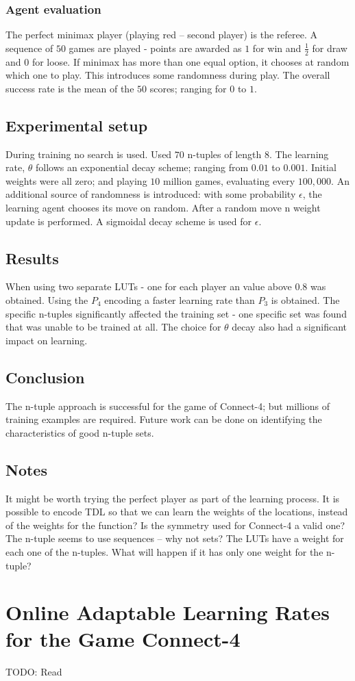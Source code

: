 \subsubsection{Agent evaluation}
The perfect minimax player (playing red -- second player) is the referee. A sequence of $50$ games are played - points are awarded as $1$ for win and $\frac{1}{2}$ for draw and $0$ for loose. If minimax has more than one equal option, it chooses at random which one to play.  This introduces some randomness during play.  The overall success rate is the mean of the $50$ scores; ranging for $0$ to $1$. 
\subsection{Experimental setup}
During training no search is used.  Used $70$ n-tuples of length $8$.  The learning rate, $\theta$ follows an exponential decay scheme; ranging from $0.01$ to $0.001$.  Initial weights were all zero; and playing $10$ million games, evaluating every $100,000$.
An additional source of randomness is introduced: with some probability $\epsilon$, the learning agent chooses its move on random. After a random move n weight update is performed. A sigmoidal decay scheme is used for $\epsilon$. 
\subsection{Results}
When using two separate LUTs - one for each player an value above $0.8$ was obtained. Using the $P_4$ encoding a faster  learning rate than $P_3$ is obtained.  The specific n-tuples significantly affected the training set - one specific set was found that was unable to be trained at all.  The choice for $\theta$ decay also had a significant impact on learning.
\subsection{Conclusion}
The n-tuple approach is successful for the game of Connect-4; but millions of training examples are required.  Future work can be done on identifying the characteristics of good n-tuple sets.	

\subsection{Notes}
It might be worth trying the perfect player as part of the learning process.  
It is possible to encode TDL so that we can learn the weights of the locations, instead of the weights for the function? Is the symmetry used for Connect-4 a valid one?  The n-tuple seems to use sequences -- why not sets?
The LUTs have a weight for each one of the n-tuples.  What will happen if it has only one weight for the n-tuple?

\section{Online Adaptable Learning Rates for the Game Connect-4}
\cite{bagheri:online}
TODO: Read
